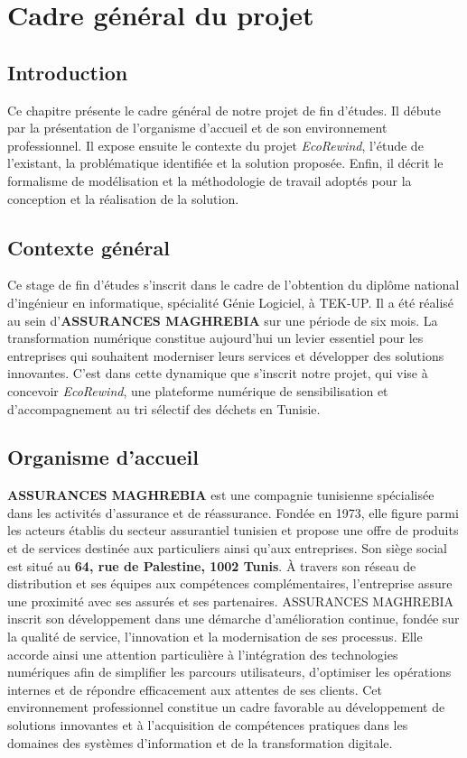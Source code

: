 \chapter{Cadre général du projet}
\label{chap:cadre-projet}

\section*{Introduction}

Ce chapitre présente le cadre général de notre projet de fin d'études. Il débute par la présentation de l'organisme d'accueil et de son environnement professionnel. Il expose ensuite le contexte du projet \textit{EcoRewind}, l'étude de l'existant, la problématique identifiée et la solution proposée. Enfin, il décrit le formalisme de modélisation et la méthodologie de travail adoptés pour la conception et la réalisation de la solution.

\section{Contexte général}

Ce stage de fin d'études s'inscrit dans le cadre de l'obtention du diplôme national d'ingénieur en informatique, spécialité Génie Logiciel, à TEK-UP. Il a été réalisé au sein d'\textbf{ASSURANCES MAGHREBIA} sur une période de six mois. La transformation numérique constitue aujourd'hui un levier essentiel pour les entreprises qui souhaitent moderniser leurs services et développer des solutions innovantes. C'est dans cette dynamique que s'inscrit notre projet, qui vise à concevoir \textit{EcoRewind}, une plateforme numérique de sensibilisation et d'accompagnement au tri sélectif des déchets en Tunisie.

\section{Organisme d'accueil}

\textbf{ASSURANCES MAGHREBIA} est une compagnie tunisienne spécialisée dans les activités d'assurance et de réassurance. Fondée en 1973, elle figure parmi les acteurs établis du secteur assurantiel tunisien et propose une offre de produits et de services destinée aux particuliers ainsi qu'aux entreprises. Son siège social est situé au \textbf{64, rue de Palestine, 1002 Tunis}. À travers son réseau de distribution et ses équipes aux compétences complémentaires, l'entreprise assure une proximité avec ses assurés et ses partenaires. ASSURANCES MAGHREBIA inscrit son développement dans une démarche d'amélioration continue, fondée sur la qualité de service, l'innovation et la modernisation de ses processus. Elle accorde ainsi une attention particulière à l'intégration des technologies numériques afin de simplifier les parcours utilisateurs, d'optimiser les opérations internes et de répondre efficacement aux attentes de ses clients. Cet environnement professionnel constitue un cadre favorable au développement de solutions innovantes et à l'acquisition de compétences pratiques dans les domaines des systèmes d'information et de la transformation digitale.

